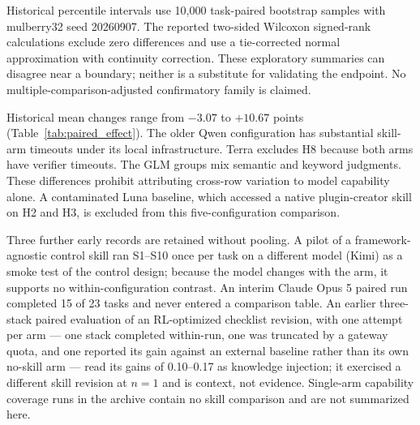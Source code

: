 \documentclass[11pt]{article}
\begin{document}
Historical percentile intervals use 10,000 task-paired bootstrap samples with mulberry32 seed 20260907. The reported two-sided Wilcoxon signed-rank calculations exclude zero differences and use a tie-corrected normal approximation with continuity correction. These exploratory summaries can disagree near a boundary; neither is a substitute for validating the endpoint. No multiple-comparison-adjusted confirmatory family is claimed.


Historical mean changes range from $-3.07$ to $+10.67$ points (Table~\ref{tab:paired_effect}). The older Qwen configuration has substantial skill-arm timeouts under its local infrastructure. Terra excludes H8 because both arms have verifier timeouts. The GLM groups mix semantic and keyword judgments. These differences prohibit attributing cross-row variation to model capability alone. A contaminated Luna baseline, which accessed a native plugin-creator skill on H2 and H3, is excluded from this five-configuration comparison.

Three further early records are retained without pooling. A pilot of a framework-agnostic control skill ran S1--S10 once per task on a different model (Kimi) as a smoke test of the control design; because the model changes with the arm, it supports no within-configuration contrast. An interim Claude Opus 5 paired run completed 15 of 23 tasks and never entered a comparison table. An earlier three-stack paired evaluation of an RL-optimized checklist revision, with one attempt per arm --- one stack completed within-run, one was truncated by a gateway quota, and one reported its gain against an external baseline rather than its own no-skill arm --- read its gains of 0.10--0.17 as knowledge injection; it exercised a different skill revision at $n{=}1$ and is context, not evidence. Single-arm capability coverage runs in the archive contain no skill comparison and are not summarized here.
\end{document}
